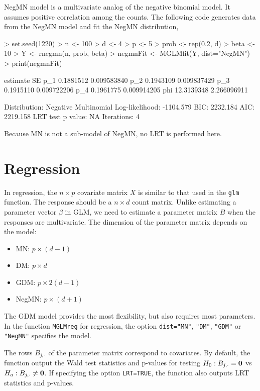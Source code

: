 \documentclass[a4paper]{article}
\begin{document}
NegMN model is a multivariate analog of the negative binomial model. It assumes positive correlation among the counts. The following code generates data from the NegMN model and fit the NegMN distribution,
\begin{Schunk}
\begin{Sinput}
> set.seed(1220)
> n <- 100
> d <- 4
> p <- 5
> prob <- rep(0.2, d)
> beta <- 10
> Y <- rnegmn(n, prob, beta)
> negmnFit <- MGLMfit(Y, dist="NegMN")
> print(negmnFit)
\end{Sinput}
\begin{Soutput}
      estimate          SE
p_1  0.1881512 0.009583840
p_2  0.1943109 0.009837429
p_3  0.1915110 0.009722206
p_4  0.1961775 0.009914205
phi 12.3139348 2.266096911

Distribution: Negative Multinomial
Log-likelihood: -1104.579
BIC: 2232.184
AIC: 2219.158
LRT test p value: NA
Iterations: 4
\end{Soutput}
\end{Schunk}
Because MN is not a sub-model of NegMN, no LRT is performed here.

\section{Regression}

In regression, the $n \times p$ covariate matrix $X$ is similar to that used in the {\tt glm} function. The response should be a $n \times d$ count matrix. Unlike estimating a parameter vector $\beta$ in GLM, we need to estimate a parameter matrix $B$ when the responses are multivariate.  The dimension of the parameter matrix depends on the model: 
\begin{itemize}
\item MN:     $p\times (d-1)$
\item DM:     $p\times d$
\item GDM:    $p\times 2(d-1)$
\item NegMN:  $p\times (d+1)$
\end{itemize}
The GDM model provides the most flexibility, but also requires most parameters.  In the function {\tt MGLMreg} for regression, the option {\tt dist="MN"}, {\tt "DM"}, {\tt "GDM"} or {\tt "NegMN"} specifies the model. 

The rows $B_{j,\cdot}$ of the parameter matrix correspond to covariates. By default, the function output the Wald test statistics and p-values for testing $H_0: B_{j,\cdot}={\bf 0}$ vs $H_a: B_{j, \cdot}\neq {\bf 0}$. If specifying the option {\tt LRT=TRUE}, the function also outputs LRT statistics and p-values.
\end{document}
